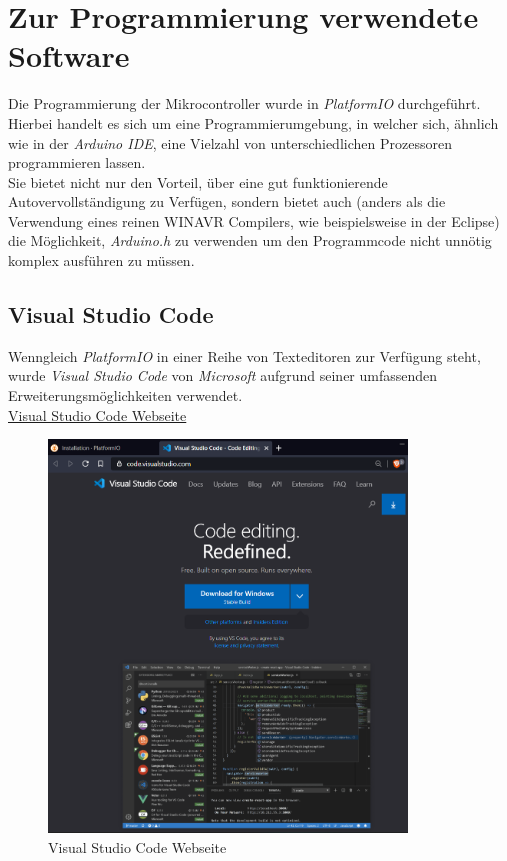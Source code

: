 \section{Zur Programmierung verwendete Software}
Die Programmierung der Mikrocontroller wurde in \textit{PlatformIO} durchgeführt. 
Hierbei handelt es sich um eine Programmierumgebung, in welcher sich, ähnlich wie in der \textit{Arduino IDE}, eine Vielzahl von unterschiedlichen Prozessoren programmieren lassen.\\
Sie bietet nicht nur den Vorteil, über eine gut funktionierende Autovervollständigung zu Verfügen, sondern bietet auch (anders als die Verwendung eines reinen WINAVR Compilers, wie beispielsweise in der Eclipse) die Möglichkeit, \textit{Arduino.h} zu verwenden 
um den Programmcode nicht unnötig komplex ausführen zu müssen.

\newpage

\subsection{Visual Studio Code}
Wenngleich \textit{PlatformIO} in einer Reihe von Texteditoren zur Verfügung steht, wurde \textit{Visual Studio Code} von \textit{Microsoft} aufgrund seiner umfassenden Erweiterungsmöglichkeiten verwendet.\\
\href{https://code.visualstudio.com/}{Visual Studio Code Webseite}
\begin{figure}[h]
	\centering
	\includegraphics[width=0.85\textwidth]{bilder/Webseite_VSCode.png}
	\caption{Visual Studio Code Webseite}
\end{figure}

